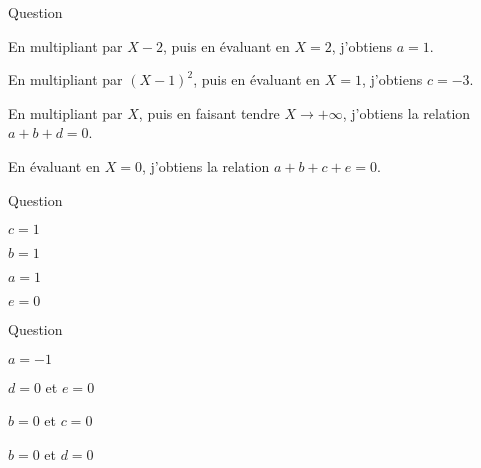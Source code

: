 \begin{multi}[multiple,feedback=
{\(\frac{P(X)}{Q(X)} = \frac{3X}{(X-2)(X-1)^2(X^2-X+1)}
=\frac{2}{X-2} + \frac{-3}{X-1} +  \frac{-3}{(X-1)^2}
+ \frac{X+1}{X^2-X+1}\).
}]{Question}
    \item En multipliant par \(X-2\), puis en évaluant en \(X=2\), j'obtiens \(a=1\).
    \item* En multipliant par \((X-1)^2\), puis en évaluant en \(X=1\), j'obtiens \(c=-3\).
    \item* En multipliant par \(X\), puis en faisant tendre \(X \to +\infty\), j'obtiens la relation \(a+b+d=0\).
    \item En évaluant en \(X=0\), j'obtiens la relation \(a+b+c+e=0\).
\end{multi}


\begin{multi}[multiple,feedback=
{On profite que \(F\) est impaire pour déduire \(b=0\), \(e=0\).
\(F(X) = \dfrac{1}{(X^2+1)X^3} = \frac{-1}{X}  +  \frac{1}{X^3}
+ \frac{X}{X^2+1}.\)
}]{Question}
    \item* \(c=1\)
    \item \(b=1\)
    \item \(a=1\)
    \item* \(e=0\)
\end{multi}


\begin{multi}[multiple,feedback=
{\(F(X) = \dfrac{1}{X(X^2+1)^2} = \frac{-1}{X} + \frac{X}{X^2+1} +  \frac{X+1}{(X^2+1)^2}.\)
}]{Question}
    \item* \(a=-1\)
    \item \(d=0\) et \(e=0\)
    \item \(b=0\) et \(c=0\)
    \item \(b=0\) et \(d=0\)
\end{multi}
